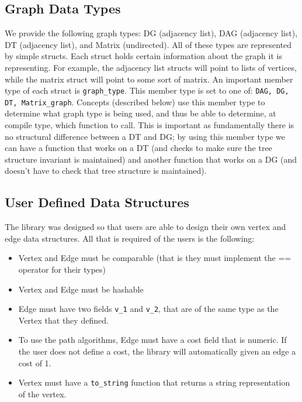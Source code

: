 \documentclass[12pt]{article}
\begin{document}
\subsection{Graph Data Types}
We provide the following graph types: DG (adjacency list), DAG (adjacency list), DT (adjacency list), and Matrix (undirected). All of these types are represented by simple structs. Each struct holds certain information about the graph it is representing. For example, the adjacency list structs will point to lists of vertices, while the matrix struct will point to some sort of matrix. An important member type of each struct is \texttt{graph\_type}. This member type is set to one of: \texttt{DAG, DG, DT, Matrix\_graph}. Concepts (described below) use this member type to determine what graph type is being used, and thus be able to determine, at compile type, which function to call. This is important as fundamentally there is no structural difference between a DT and DG; by using this member type we can have a function that works on a DT (and checks to make sure the tree structure invariant is maintained) and another function that works on a DG (and doesn't have to check that tree structure is maintained).

\subsection{User Defined Data Structures}
The library was designed so that users are able to design their own vertex and edge data structures. All that is required of the users is the following:
\begin{itemize}
\item Vertex and Edge must be comparable (that is they must implement the == operator for their types)
\item Vertex and Edge must be hashable
\item Edge must have two fields \texttt{v\_1} and \texttt{v\_2}, that are of the same type as the Vertex that they defined.
\item To use the path algorithms, Edge must have a cost field that is numeric. If the user does not define a cost, the library will automatically given an edge a cost of 1.
\item Vertex must have a \texttt{to\_string} function that returns a string representation of the vertex. 
\end{itemize}
\end{document}
